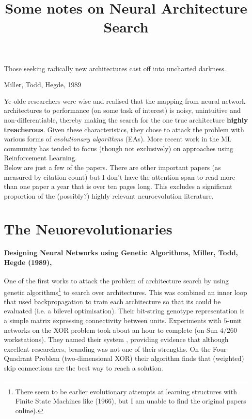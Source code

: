 \documentclass[10pt]{article}
\date{}
\begin{document}
\title{Some notes on Neural Architecture Search}
\maketitle

\epigraph{Those seeking radically new architectures cast off into uncharted darkness.}{Miller, Todd, Hegde, 1989}

\setlength{\parindent}{0pt}

Ye olde researchers were wise and realised that the mapping from neural network architectures to performance (on some task of interest) is noisy, unintuitive and non-differentiable, thereby making the search for the one true architecture \textbf{highly treacherous}.  Given these characteristics, they chose to attack the problem with various forms of \textit{evolutionary algorithms} (EAs).  More recent work in the ML community has tended to focus (though not exclusively) on approaches using Reinforcement Learning.\\

Below are just a few of the papers. There are other important papers (as measured by citation count) but I don't have the attention span to read more than one paper a year that is over ten pages long. This excludes a significant proportion of the (possibly?) highly relevant neuroevolution literature.

\section[Darwinians]{The Neuorevolutionaries}


\paragraph{Designing Neural Networks using Genetic Algorithms, Miller, Todd, Hegde (1989),\mbox{~\cite{miller1989designing,todd1988}}}  One of the first works to attack the problem of architecture search by using genetic algorithms\footnote{There seem to be earlier evolutionary attempts at learning structures with Finite State Machines like \cite{fogel1966} (1966), but I am unable to find the original papers online).} to search over architectures.  This was combined an inner loop that used backpropagation to train each architecture so that its  could be evaluated (i.e. a bilevel optimisation).  Their bit-string genotype representation is a simple matrix expressing connectivity between units.  Experiments with $5$-unit networks on the XOR problem took about an hour to complete (on Sun $4/260$ workstations).  They named their system , providing evidence that although excellent researchers, branding was not one of their strengths.  On the Four-Quadrant Problem (two-dimensional XOR) their algorithm finds that (weighted) skip connections are the best way to reach a solution.
\end{document}
